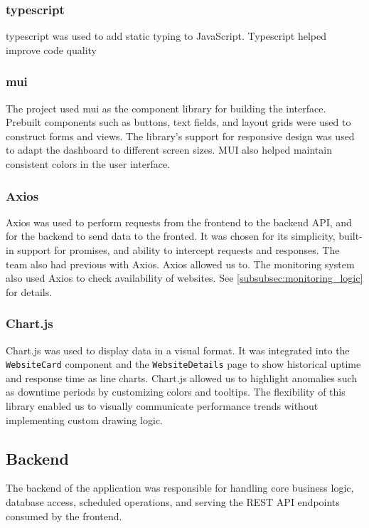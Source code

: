\subsubsection{\gls{typescript}}
\gls{typescript} was used to add static typing to JavaScript. Typescript helped improve code quality


\subsubsection{\gls{mui}}
The project used \gls{mui} as the component library for building the interface. Prebuilt components such as buttons, text fields, and layout grids were used to construct forms and views. The library’s support for responsive design was used to adapt the dashboard to different screen sizes. MUI also helped maintain consistent colors in the user interface.

\subsubsection{Axios}
Axios was used to perform requests from the frontend to the backend API, and for the backend to send data to the fronted. It was chosen for its simplicity, built-in support for promises, and ability to intercept requests and responses. The team also had previous with Axios. Axios allowed us to. The monitoring system also used Axios to check availability of websites. See \autoref{subsubsec:monitoring_logic} for details.


\subsubsection{Chart.js}
Chart.js was used to display data in a visual format. It was integrated into the \texttt{WebsiteCard} component and the \texttt{WebsiteDetails} page to show historical uptime and response time as line charts. Chart.js allowed us to highlight anomalies such as downtime periods by customizing colors and tooltips. The flexibility of this library enabled us to visually communicate performance trends without implementing custom drawing logic.


\subsection{Backend}
The backend of the application was responsible for handling core business logic, database access, scheduled operations, and serving the REST API endpoints consumed by the frontend.

